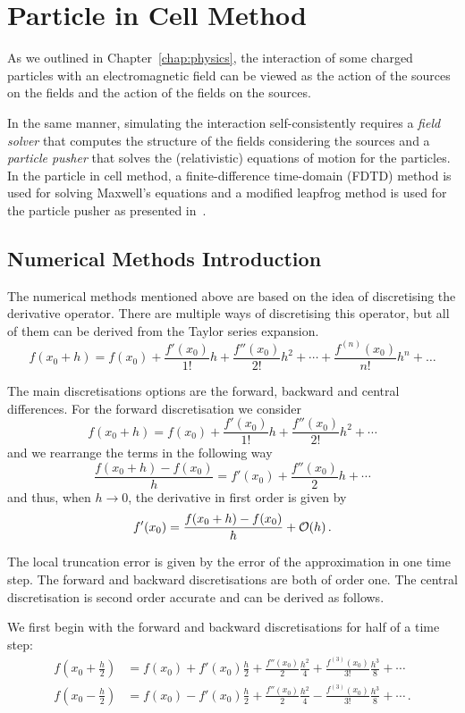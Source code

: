 \documentclass[12pt, class=report, crop=false]{standalone}
\begin{document}
\chapter{Particle in Cell Method}%
\label{chap:pic}

As we outlined in Chapter~\ref{chap:physics}, the interaction
of some charged particles with an electromagnetic field can be viewed as the
action of the sources on the fields and the action of the fields on the sources.

In the same manner, simulating the interaction self-consistently requires a
\emph{field solver} that computes the structure of the fields considering
the sources and a \emph{particle pusher} that solves the (relativistic)
equations of motion for the particles.
In the particle in cell method, a finite-difference time-domain (FDTD) method
is used for solving Maxwell's equations and a modified leapfrog method is used
for the particle pusher as presented in~\cite{arber_contemporaryparticleincell_2015}.

\section{Numerical Methods Introduction}

The numerical methods mentioned above are based on the idea of discretising the
derivative operator. There are multiple ways of discretising this operator,
but all of them can be derived from the Taylor series expansion.
\[
  f(x_0+h) = f(x_0) + \frac{f'(x_0)}{1!}h + \frac{f''(x_0)}{2!}h^2 + \dotsb + \frac{f^{(n)}(x_0)}{n!}h^n + \dots
\]

The main discretisations options are the forward, backward and central differences.
For the forward discretisation we consider
\[
  f(x_0+h) = f(x_0) + \frac{f'(x_0)}{1!}h + \frac{f''(x_0)}{2!}h^2 + \dotsb
\]
and we rearrange the terms in the following way
\[
  \frac{f(x_0+h) - f(x_0)}{h} = f'(x_0) + \frac{f''(x_0)}{2}h + \dotsb
\]
and thus, when \(h \to 0\), the derivative in first order is given by
\[
  f'(x_0) = \frac{f(x_0+h) - f(x_0)}{h} + \order{h}\,.
\]

The local truncation error is given by the error of the approximation in one time
step. The forward and backward discretisations are both of order one. The
central discretisation is second order accurate and can be derived as follows.

We first begin with the forward and backward discretisations for half of a
time step:
\begin{align*}
  f(x_0+\frac{h}{2}) &= f(x_0) + f'(x_0)\frac{h}{2} + \frac{f''(x_0)}{2}\frac{h^2}{4}
    + \frac{f^{(3)}(x_0)}{3!}\frac{h^3}{8} + \dotsb \\
  f(x_0-\frac{h}{2}) &= f(x_0) - f'(x_0)\frac{h}{2} + \frac{f''(x_0)}{2}\frac{h^2}{4}
    - \frac{f^{(3)}(x_0)}{3!}\frac{h^3}{8} + \dotsb \,.
\end{align*}
\end{document}
